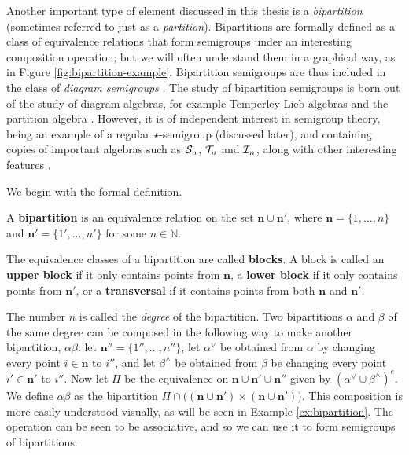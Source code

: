 Another important type of element discussed in this thesis is a
\textit{bipartition} (sometimes referred to just as a \textit{partition}).
Bipartitions are formally defined as a class of equivalence relations that form
semigroups under an interesting composition operation; but we will often
understand them in a graphical way, as in Figure \ref{fig:bipartition-example}.
Bipartition semigroups are thus included in the class of \textit{diagram
  semigroups} \cite{diagram_semigroups}.  The study of bipartition semigroups is
born out of the study of diagram algebras, for example Temperley-Lieb algebras
and the partition algebra \cite{partition_algebra}.  However, it is of
independent interest in semigroup theory, being an example of a regular
$\star$-semigroup (discussed later), and containing copies of important algebras
such as $\mathcal{S}_n$, $\mathcal{T}_n$ and $\mathcal{I}_n$, along with other interesting features
\cite[\S1]{deg_motzkin}.

We begin with the formal definition.

\begin{definition}
  \label{def:bipartition}
  A \textbf{bipartition} is an equivalence relation on the set
  $\mathbf{n} \cup \mathbf{n}'$, where $\mathbf{n} = \{1, \ldots, n\}$ and
  $\mathbf{n}' = \{1', \ldots, n'\}$ for some $n \in \mathbb{N}$.
\end{definition}

The equivalence classes of a bipartition are called \textbf{blocks}.  A block is
called an \textbf{upper block} if it only contains points from $\mathbf{n}$, a
\textbf{lower block} if it only contains points from $\mathbf{n}'$, or a
\textbf{transversal} if it contains points from both $\mathbf{n}$ and
$\mathbf{n}'$.

The number $n$ is called the \textit{degree} of the
bipartition.   Two
bipartitions $\alpha$ and $\beta$ of the same degree can be composed in the
following way to make another bipartition, $\alpha \beta$: let
$\mathbf{n}'' = \{1'', \ldots, n''\}$, let $\alpha^\vee$ be obtained from
$\alpha$ by changing every point $i \in \mathbf{n}$ to $i''$, and let
$\beta^\wedge$ be obtained from $\beta$ be changing every point
$i' \in \mathbf{n}'$ to $i''$.  Now let $\Pi$ be the equivalence on
$\mathbf{n} \cup \mathbf{n}' \cup \mathbf{n}''$ given by
$(\alpha^\vee \cup \beta^\wedge)^e$.  We define $\alpha \beta$ as the
bipartition
$\Pi \cap \big((\mathbf{n} \cup \mathbf{n}') \times (\mathbf{n} \cup
\mathbf{n}')\big)$.  This composition is more easily understood visually, as
will be seen in Example \ref{ex:bipartition}.  The operation can be seen to be
associative, and so we can use it to form semigroups of bipartitions.

